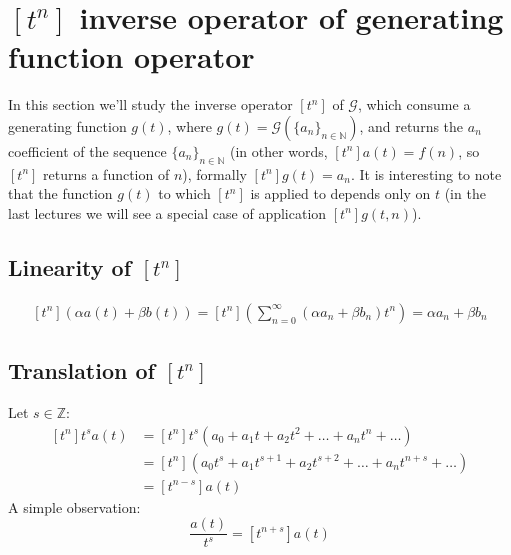 
\section{ $[t^{n}] $ inverse operator of generating function operator}

In this section we'll study the inverse operator $[t^{n}] $ of
$\mathcal{G} $, which consume a generating function $g(t)$, where
$g(t) = \mathcal{G} (\{a_n\}_{n\in\mathbb{N} } )$, and returns the
$a_n$ coefficient of the sequence $\{a_n\}_{n\in\mathbb{N} }$ (in
other words, $[t^n]a(t) = f(n)$, so $[t^n]$ returns a function of
$n$), formally $[t^{n}] g(t) = a_n$. It is interesting to note that
the function $g(t)$ to which $[t^n]$ is applied to depends only on $t$
(in the last lectures we will see a special case of application
$[t^n]g(t,n)$).

\subsection{Linearity of $[t^{n}] $}
\begin{displaymath}
  \begin{split}
    [t^{n}] (\alpha a(t) + \beta b(t)) = [t^{n}]
    \left(\sum_{n=0}^{\infty}{(\alpha a_n + \beta b_n )t^n}\right) =
    \alpha a_n + \beta b_n
  \end{split}
\end{displaymath}

\subsection{Translation of $[t^{n}] $}
Let $s\in \mathbb{Z}$:
\begin{displaymath}
  \begin{split}
    [t^{n}] t^s a(t) &= [t^{n}] t^s (a_0 + a_1 t + a_2 t^2 + \ldots +
    a_n t^n + \ldots )\\
    &= [t^{n}] (a_0 t^s + a_1 t^{s+1} + a_2 t^{s+2} + \ldots + a_n
    t^{n+s} + \ldots )\\
    &= [t^{n-s}] a(t)
  \end{split}
\end{displaymath}
A simple observation:
\begin{displaymath}
  [t^{n}]  \frac{  a(t)}{t^s} = [t^{n+s}] a(t)
\end{displaymath}

